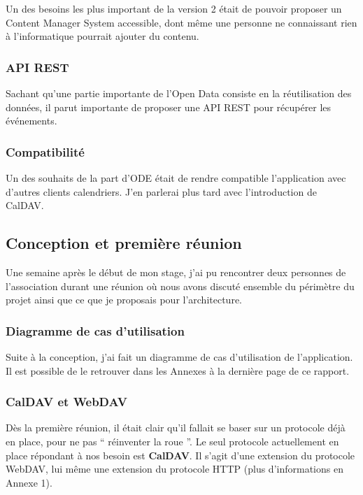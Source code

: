 Un des besoins les plus important de la version 2 était de pouvoir proposer un Content Manager System accessible, dont même une personne ne connaissant rien à l'informatique pourrait ajouter du contenu.

\subsubsection*{API REST}

Sachant qu'une partie importante de l'Open Data consiste en la réutilisation des données, il parut importante de proposer une API REST pour récupérer les événements.

\subsubsection*{Compatibilité}

Un des souhaits de la part d'ODE était de rendre compatible l'application avec d'autres clients calendriers. J'en parlerai plus tard avec l'introduction de CalDAV.

\subsection{Conception et première réunion}

Une semaine après le début de mon stage, j'ai pu rencontrer deux personnes de l'association durant une réunion où nous avons discuté ensemble du périmètre du projet ainsi que ce que je proposais pour l'architecture.

\subsubsection*{Diagramme de cas d'utilisation}

Suite à la conception, j'ai fait un diagramme de cas d'utilisation de l'application. Il est possible de le retrouver dans les Annexes à la dernière page de ce rapport.

\subsubsection*{CalDAV et WebDAV}

Dès la première réunion, il était clair qu'il fallait se baser sur un protocole déjà en place, pour ne pas `` réinventer la roue ''. Le seul protocole actuellement en place répondant à nos besoin est \textbf{CalDAV}. Il s'agit d'une extension du protocole WebDAV, lui même une extension du protocole HTTP (plus d'informations en Annexe 1). 

